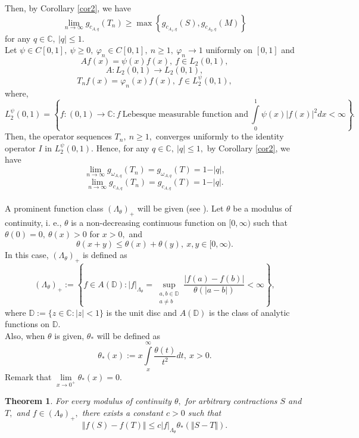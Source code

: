 \documentclass[preprint,12pt,3p]{elsarticle}
\newtheorem{theorem}{Theorem}
\begin{document}
Then, by Corollary \ref{cor2}, we have
$$
\lim\limits_{n\rightarrow \infty}g_{c_{A,q}}(T_{n}) \geq \max \left\lbrace g_{c_{A_{1},q}}(S),g_{c_{A_{2},q}}(M) \right\rbrace 
$$
for any $ q\in \mathbb{C}, \ \vert q \vert \leq 1. $ \\ 
Let $ \psi \in C[0,1], \ \psi \geq 0, \ \varphi_{n}\in C[0,1], \ n\geq 1, \ \varphi_{n}\rightarrow 1  $ uniformly on $ [0,1] $ and 
$$
Af(x)=\psi(x)f(x), \ f\in L_{2}(0,1),
$$
$$
A: L_{2}(0,1) \rightarrow L_{2}(0,1),
$$
$$
T_{n}f(x)=\varphi_{n}(x)f(x), \ f\in L_{2}^{\psi}(0,1),
$$
where,
$$
L_{2}^{\psi}(0,1)= \left\lbrace f:(0,1)\rightarrow \mathbb{C}: f \ \text{Lebesque  measurable function and}\ \int\limits_{0}^{1}\psi (x) \vert f(x) \vert^{2}dx<\infty \right\rbrace.  
$$ 
Then, the operator sequences $ T_{n}, \ n\geq 1, $ converges uniformly to the identity operator $ I $ in $ L_{2}^{\psi}(0,1). $ Hence, for any $ q\in \mathbb{C}, \ \vert q \vert \leq 1, $ by Corollary \ref{cor2}, we have
$$
\lim\limits_{n\rightarrow \infty}g_{\omega_{A,q}}(T_{n})=g_{\omega_{A,q}}(T)=1-\vert q \vert,
$$
$$
\lim\limits_{n\rightarrow \infty}g_{c_{A,q}}(T_{n})=g_{c_{A,q}}(T)=1-\vert q \vert .
$$
\\
A prominent function class $ (\Lambda_{\theta})_{+} $ will be given (see \cite{Aleksandrov}). Let $ \theta $ be a modulus of continuity, i. e., $ \theta $ is a non-decreasing continuous function on $ [0,\infty) $ such that $ \theta (0)=0, \ \theta(x)>0 $ for $ x>0, $ and 
$$
\theta (x+y)\leq \theta (x)+ \theta(y), \ x,y\in [0,\infty).
$$
In this case, $ (\Lambda_{\theta})_{+} $ is defined as
$$
(\Lambda_{\theta})_{+} := \left\lbrace  f\in A(\mathbb{D}): \vert f \vert_{\Lambda_{\theta}}= \sup_{\substack{a,b\in\mathbb{D} \\ a\neq b}}\frac{\vert f(a)-f(b)\vert}{\theta(\vert a-b\vert)}<\infty\right\rbrace ,
$$
where $ \mathbb{D}:= \lbrace z\in \mathbb{C}: \vert z \vert<1 \rbrace $ is the unit disc and $ A(\mathbb{D}) $ is the class of analytic functions on $ \mathbb{D}. $ \\
Also, when $ \theta $ is given, $ \theta_{*} $ will be defined as
$$
\theta_{*}(x):=x \int\limits_{x}^{\infty}\frac{\theta(t)}{t^{2}}dt, \ x>0.
$$
Remark that $ \lim\limits_{x\rightarrow 0^{+}}\theta_{*}(x)=0. $
\begin{theorem} 
\cite{Aleksandrov} For every modulus of continuity $ \theta, $ for arbitrary contractions $ S $ and $ T, $ and $ f\in (\Lambda_{\theta})_{+}, $ there exists a constant $ c>0 $ such that 
$$
\Vert f(S)-f(T)\Vert\leq c \vert f \vert_{\Lambda_{\theta}}\theta_{*}(\Vert S-T \Vert).
$$
\end{theorem}
\end{document}
